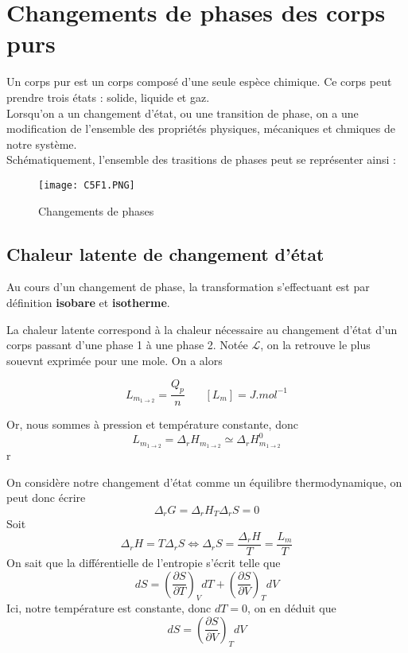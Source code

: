 
\chapter{Changements de phases des corps purs}

Un corps pur est un corps composé d'une seule espèce chimique. Ce corps peut prendre trois états : solide, liquide et gaz.\\

Lorsqu'on a un changement d'état, ou une transition de phase, on a une modification de l'ensemble des propriétés physiques, mécaniques et chmiques de notre système.\\

Schématiquement, l'ensemble des trasitions de phases peut se représenter ainsi :

\begin{figure}[H]
\centering
\texttt{[image: C5F1.PNG]}
\caption{Changements de phases}
\end{figure}

\section{Chaleur latente de changement d'état}

Au cours d'un changement de phase, la transformation s'effectuant est par définition \textbf{isobare} et \textbf{isotherme}. 

\begin{definition}

La chaleur latente correspond à la chaleur nécessaire au changement d'état d'un corps passant d'une phase 1 à une phase 2. Notée $\mathcal{L}$, on la retrouve le plus souevnt exprimée pour une mole. On a alors

\begin{equation}
L_{m_{1\rightarrow2}}=\frac{Q_p}{n}~~~~~~~~[L_m]=J.mol^{-1}
\end{equation}
\end{definition}

Or, nous sommes à pression et température constante, donc
$$L_{m_{1\rightarrow2}}=\Delta_rH_{m_{1\rightarrow 2}} \simeq \Delta_rH_{m_{1\rightarrow 2}}^0$$r

On considère notre changement d'état comme un équilibre thermodynamique, on peut donc écrire 
$$\Delta_rG = \Delta_rH _ T\Delta_rS =0$$
Soit
$$\Delta_rH = T \Delta_rS \Leftrightarrow \Delta_rS = \frac{\Delta_rH}{T}=\frac{L_m}{T}$$
On sait que la différentielle de l'entropie s'écrit telle que
$$dS=\left ( \frac{\partial S}{\partial T}\right ) _V dT + \left ( \frac{\partial S}{\partial V}\right ) _T dV$$
Ici, notre température est constante, donc $dT=0$, on en déduit que
$$dS = \left ( \frac{\partial S}{\partial V}\right ) _T dV$$

